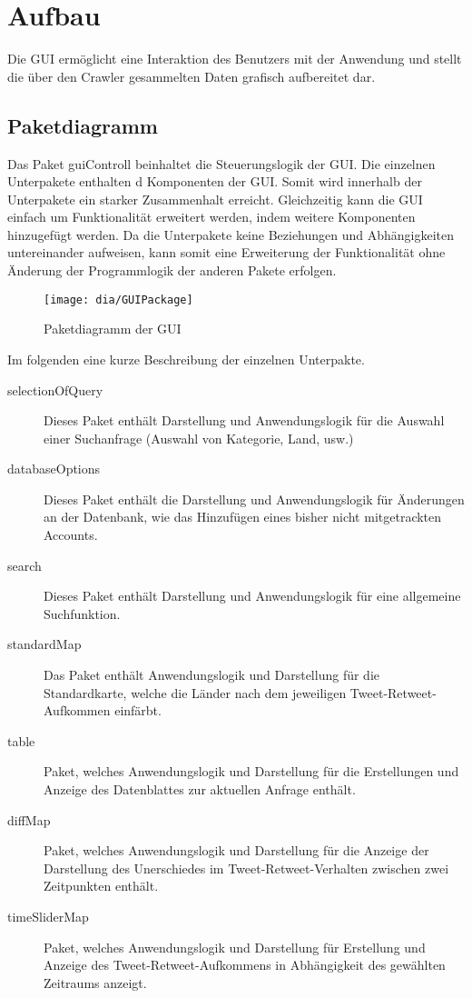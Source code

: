 \section{Aufbau}
Die GUI ermöglicht eine Interaktion des Benutzers mit der Anwendung und stellt die über den Crawler gesammelten Daten grafisch aufbereitet dar.\\
\subsection{Paketdiagramm}
Das Paket {guiControll} beinhaltet die Steuerungslogik der GUI. Die einzelnen Unterpakete enthalten d Komponenten der GUI. Somit wird innerhalb der Unterpakete ein starker Zusammenhalt erreicht. Gleichzeitig kann die GUI einfach um Funktionalität erweitert werden, indem weitere Komponenten hinzugefügt werden. Da die Unterpakete keine Beziehungen und Abhängigkeiten untereinander aufweisen, kann somit eine Erweiterung der Funktionalität ohne Änderung der Programmlogik der anderen Pakete erfolgen. 
\begin{figure}[h!]
	\centering
	\texttt{[image: dia/GUIPackage]}
	\caption{Paketdiagramm der GUI}
	\label{fig:GUI}
\end{figure}


Im folgenden eine kurze Beschreibung der einzelnen Unterpakte.
\begin{description}
		\item [selectionOfQuery] Dieses Paket enthält Darstellung und Anwendungslogik für die Auswahl einer Suchanfrage (Auswahl von Kategorie, Land, usw.)
		\item[databaseOptions] Dieses Paket enthält die Darstellung und Anwendungslogik für Änderungen an der Datenbank, wie das Hinzufügen eines bisher nicht mitgetrackten Accounts.
		\item[search] Dieses Paket enthält Darstellung und Anwendungslogik für eine allgemeine Suchfunktion.
		\item [standardMap] Das Paket enthält Anwendungslogik und Darstellung für die Standardkarte, welche die Länder nach dem jeweiligen Tweet-Retweet-Aufkommen einfärbt.
		\item [table] Paket, welches Anwendungslogik und Darstellung für die Erstellungen und Anzeige des Datenblattes zur aktuellen Anfrage enthält.
		\item[diffMap] Paket, welches Anwendungslogik und Darstellung für die Anzeige der Darstellung des Unerschiedes im Tweet-Retweet-Verhalten zwischen zwei Zeitpunkten enthält.
		\item [timeSliderMap] Paket, welches Anwendungslogik und Darstellung für Erstellung und Anzeige des Tweet-Retweet-Aufkommens in Abhängigkeit des gewählten Zeitraums anzeigt.
		
\end{description}

